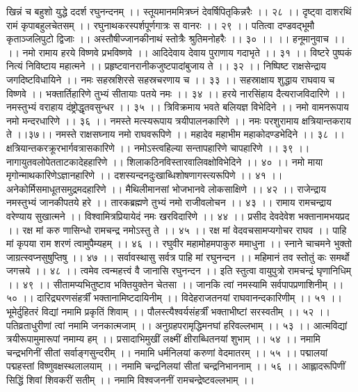 खिन्नं च बहुशो युद्धे ददर्श रघुनन्दनम् ।।
स्तूयमानममित्रघ्नं देवर्षिपितृकिन्नरैः ।। २८ ।।
दृष्ट्वा दाशरथिं रामं कृपाबहुलचेतसम् ।।
रघुनाथकरस्पर्शपूर्णगात्रः स वानरः ।। २९ ।।
पतित्वा दण्डवद्भूमौ कृताञ्जलिपुटो द्विजाः ।।
अस्तौषीज्जानकीनाथं स्तोत्रैः श्रुतिमनोहरैः ।। ३० ।।
।। हनूमानुवाच ।। ।।
नमो रामाय हरये विष्णवे प्रभविष्णवे ।।
आदिदेवाय देवाय पुराणाय गदाभृते ।। ३१ ।।
विष्टरे पुष्पकं नित्यं निविष्टाय महात्मने ।।
प्रहृष्टवानरानीकजुष्टपादांबुजाय ते ।। ३२ ।।
निष्पिष्ट राक्षसेन्द्राय जगदिष्टविधायिने ।।
नमः सहस्रशिरसे सहस्रचरणाय च ।। ३३ ।।
सहस्राक्षाय शुद्धाय राघवाय च विष्णवे ।।
भक्तार्तिहारिणे तुभ्यं सीतायाः पतये नमः ।। ३४ ।।
हरये नारसिंहाय दैत्यराजविदारिणे ।।
नमस्तुभ्यं वराहाय दंष्ट्रोद्धृतवसुन्धर ।। ३५ ।।
त्रिविक्रमाय भवते बलियज्ञ विभेदिने ।।
नमो वामनरूपाय नमो मन्दरधारिणे ।। ३६ ।।
नमस्ते मत्स्यरूपाय त्रयीपालनकारिणे ।।
नमः परशुरामाय क्षत्रियान्तकराय ते ।।३७।।
नमस्ते राक्षसघ्नाय नमो राघवरूपिणे ।।
महादेव महाभीम महाकोदण्डभेदिने ।। ३८ ।।
क्षत्रियान्तकरक्रूरभार्गवत्रासकारिणे ।।
नमोऽस्त्वहिल्या सन्तापहारिणे चापहारिणे ।। ३९ ।।
नागायुतवलोपेतताटकादेहहारिणे ।।
शिलाकठिनविस्तारवालिवक्षोविभेदिने ।। ४० ।।
नमो माया मृगोन्माथकारिणेऽज्ञानहारिणे ।।
दशस्यन्दनदुःखाब्धिशोषणागस्त्यरूपिणे ।। ४१ ।।
अनेकोर्मिसमाधूतसमुद्रमदहारिणे ।।
मैथिलीमानसां भोजभानवे लोकसाक्षिणे ।। ४२ ।।
राजेन्द्राय नमस्तुभ्यं जानकीपतये हरे ।।
तारकब्रह्मणे तुभ्यं नमो राजीवलोचन ।। ४३ ।।
रामाय रामचन्द्राय वरेण्याय सुखात्मने ।।
विश्वामित्रप्रियायेदं नमः खरविदारिणे ।। ४४ ।।
प्रसीद देवदेवेश भक्तानामभयप्रद ।।
रक्ष मां करु णासिन्धो रामचन्द्र नमोऽस्तु ते ।। ४५ ।।
रक्ष मां वेदवचसामप्यगोचर राघव ।।
पाहि मां कृपया राम शरणं त्वामुपैम्यहम् ।। ४६ ।।
रघुवीर महामोहमपाकुरु ममाधुना ।।
स्नाने चाचमने भुक्तो जाग्रत्स्वप्नसुषुप्तिषु ।। ४७ ।।
सर्वावस्थासु सर्वत्र पाहि मां रघुनन्दन ।।
महिमानं तव स्तोतुं कः समर्थो जगत्त्रये ।। ४८ ।।
त्वमेव त्वन्महत्त्वं वै जानासि रघुनन्दन ।।
इति स्तुत्वा वायुपुत्रो रामचन्द्रं घृणानिधिम् ।। ४९ ।।
सीतामप्यभितुष्टाव भक्तियुक्तेन चेतसा ।।
जानकि त्वां नमस्यामि सर्वपापप्रणाशिनीम् ।। ५० ।।
दारिद्र्यरणसंहर्त्रीं भक्तानामिष्टदायिनीम् ।।
विदेहराजतनयां राघवानन्दकारिणीम् ।। ५१ ।।
भूमेर्दुहितरं विद्यां नमामि प्रकृतिं शिवाम् ।।
पौलस्त्यैश्वर्यसंहर्त्रीं भक्ताभीष्टां सरस्वतीम् ।। ५२ ।।
पतिव्रताधुरीणां त्वां नमामि जनकात्मजाम् ।।
अनुग्रहपरामृद्धिमनघां हरिवल्लभाम् ।। ५३ ।।
आत्मविद्यां त्रयीरूपामुमारूपां नमाम्य हम् ।।
प्रसादाभिमुखीं लक्ष्मीं क्षीराब्धितनयां शुभाम् ।। ५४ ।।
नमामि चन्द्रभगिनीं सीतां सर्वाङ्गसुन्दरीम् ।।
नमामि धर्मनिलयां करुणां वेदमातरम् ।। ५५ ।।
पद्मालयां पद्महस्तां विष्णुवक्षस्थलालयाम् ।।
नमामि चन्द्रनिलयां सीतां चन्द्रनिभाननाम् ।। ५६ ।।
आह्लादरूपिणीं सिद्धिं शिवां शिवकरीं सतीम् ।।
नमामि विश्वजननीं रामचन्द्रेष्टवल्लभाम् ।।
